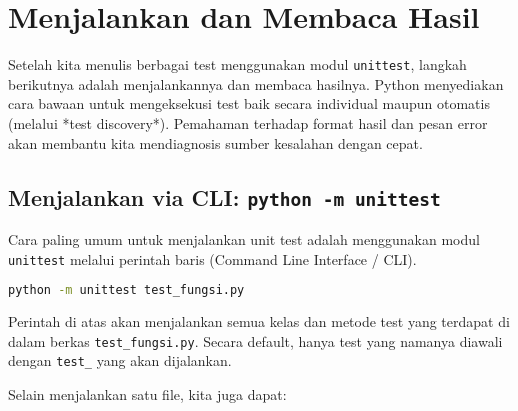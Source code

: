 \section{Menjalankan dan Membaca Hasil}

Setelah kita menulis berbagai test menggunakan modul \texttt{unittest}, langkah berikutnya adalah menjalankannya dan membaca hasilnya.  
Python menyediakan cara bawaan untuk mengeksekusi test baik secara individual maupun otomatis (melalui *test discovery*).  
Pemahaman terhadap format hasil dan pesan error akan membantu kita mendiagnosis sumber kesalahan dengan cepat.

\subsection{Menjalankan via CLI: \texttt{python -m unittest}}

Cara paling umum untuk menjalankan unit test adalah menggunakan modul \texttt{unittest} melalui perintah baris (Command Line Interface / CLI).

\begin{lstlisting}[language=bash, caption={Menjalankan file test tertentu}]
python -m unittest test_fungsi.py
\end{lstlisting}

Perintah di atas akan menjalankan semua kelas dan metode test yang terdapat di dalam berkas \texttt{test\_fungsi.py}.  
Secara default, hanya test yang namanya diawali dengan \texttt{test\_} yang akan dijalankan.

Selain menjalankan satu file, kita juga dapat:

